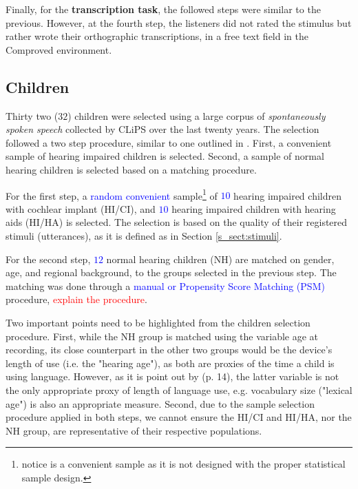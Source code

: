 Finally, for the \textbf{transcription task}, the followed steps were similar to the previous. However, at the fourth step, the listeners did not rated the stimulus but rather wrote their orthographic transcriptions, in a free text field in the Comproved environment.
%
%
\subsection{Children} \label{s_sect:children}
%
Thirty two ($32$) children were selected using a large corpus of \textit{spontaneously spoken speech} collected by CLiPS over the last twenty years. The selection followed a two step procedure, similar to one outlined in \citet{Faes_et_al_2021}. First, a convenient sample of hearing impaired children is selected. Second, a sample of normal hearing children is selected based on a matching procedure.

For the first step, a \textcolor{blue}{random convenient} sample\footnote{notice is a convenient sample as it is not designed with the proper statistical sample design.} of \textcolor{blue}{$10$} hearing impaired children with cochlear implant (HI/CI), and \textcolor{blue}{$10$} hearing impaired children with hearing aids (HI/HA) is selected. The selection is based on the quality of their registered stimuli (utterances), as it is defined as in Section \ref{s_sect:stimuli}.

For the second step, \textcolor{blue}{$12$} normal hearing children (NH) are matched on gender, age, and regional background, to the groups selected in the previous step. The matching was done through a \textcolor{blue}{manual or Propensity Score Matching (PSM)} procedure, \textcolor{red}{explain the procedure}.

Two important points need to be highlighted from the children selection procedure. First, while the NH group is matched using the variable age at recording, its close counterpart in the other two groups would be the device's length of use (i.e. the "hearing age"), as both are proxies of the time a child is using language. However, as it is point out by \citet{Faes_et_al_2021}(p. 14), the latter variable is not the only appropriate proxy of length of language use, e.g. vocabulary size ("lexical age") is also an appropriate measure. Second, due to the sample selection procedure applied in both steps, we cannot ensure the HI/CI and HI/HA, nor the NH group, are representative of their respective populations.

